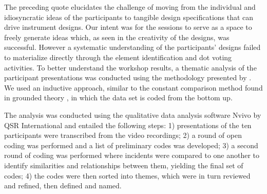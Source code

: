 \documentclass[letterpaper, 12pt]{article}
\begin{document}
The preceding quote elucidates the challenge of moving from the individual and idiosyncratic ideas of the participants to tangible design specifications that can drive instrument designs. Our intent was for the sessions to serve as a space to freely generate ideas which, as seen in the creativity of the designs, was successful. However a systematic understanding of the participants' designs failed to materialize directly through the element identification and dot voting activities. 
To better understand the workshop results, a thematic analysis of the participant presentations was conducted using the methodology presented by \citet{Braun2006}. 
We used an inductive approach, similar to the constant comparison method found in grounded theory \citep{Strauss1994}, in which the data set is coded from the bottom up.

The analysis was conducted using the qualitative data analysis software Nvivo by QSR International and entailed the following steps: 1) presentations of the ten participants were transcribed from the video recordings; 2) a round of open coding was performed and a list of preliminary codes was developed; 3) a second round of coding was performed where incidents were compared to one another to identify similarities and relationships between them, yielding the final set of codes; 4) the codes were then sorted into themes, which were in turn reviewed and refined, then defined and named.

\end{document}
